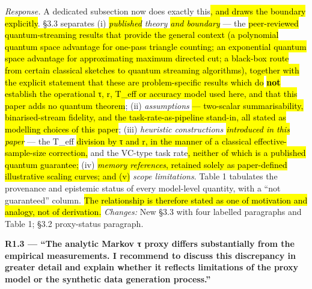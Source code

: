 \documentclass[
  11pt,
]{article}
\providecommand{\DIFadd}[1]{\hl{#1}} %
\providecommand{\DIFdel}[1]{} %
\providecommand{\DIFaddbegin}{} %
\providecommand{\DIFaddend}{} %
\providecommand{\DIFdelbegin}{} %
\providecommand{\DIFdelend}{} %
\providecommand{\DIFaddbegin}{}
\begin{document}
\emph{Response.} A dedicated subsection now does exactly this\DIFaddbegin \DIFadd{, and draws
the boundary explicitly}\DIFaddend . §3.3 separates (i) \emph{\DIFdelbegin \DIFdel{established }\DIFdelend \DIFaddbegin \DIFadd{published }\DIFaddend theory \DIFaddbegin \DIFadd{and
boundary}\DIFaddend } --- the \DIFdelbegin \DIFdel{×R sample overhead,
O(n)-qubit memory, and task-specific O(N\^{}c) classical hardness, all
theorems of the
original framework}\DIFdelend \DIFaddbegin \DIFadd{peer-reviewed quantum-streaming results that provide
the general context (a polynomial quantum space advantage for one-pass
triangle counting; an exponential quantum space advantage for
approximating maximum directed cut; a black-box route from certain
classical sketches to quantum streaming algorithms), together with the
explicit statement that these are problem-specific results which do
}\textbf{\DIFadd{not}} \DIFadd{establish the operational τ, r, T\_eff or accuracy model
used here, and that this paper adds no quantum theorem}\DIFaddend ; (ii)
\emph{assumptions} \DIFdelbegin \DIFdel{this paper
introduces}\DIFdelend \DIFaddbegin \DIFadd{--- two-scalar summarisability, binarised-stream
fidelity, and the task-rate-as-pipeline stand-in, all stated as
modelling choices of this paper}\DIFaddend ; (iii) \emph{heuristic constructions
\DIFaddbegin \DIFadd{introduced in this paper}\DIFaddend } --- the \DIFdelbegin \DIFdel{additional τ
division in }\DIFdelend T\_eff \DIFdelbegin \DIFdel{(deliberately more pessimistic than the
framework's
own accounting, under which no crossover would exist at all) }\DIFdelend \DIFaddbegin \DIFadd{division by τ and r, in the
manner of a classical effective-sample-size correction, }\DIFaddend and the VC-type
task rate\DIFdelbegin \DIFdel{used in place of oracle-construction cost; and }\DIFdelend \DIFaddbegin \DIFadd{, neither of which is a published quantum guarantee; }\DIFaddend (iv)
\DIFaddbegin \emph{\DIFadd{memory references}}\DIFadd{, retained solely as paper-defined illustrative
scaling curves; and (v) }\DIFaddend \emph{scope limitations}. Table 1 tabulates the
provenance and epistemic status of every model-level quantity, with a
``not guaranteed'' column. \DIFaddbegin \DIFadd{The relationship is therefore stated as one
of motivation and analogy, not of derivation. }\DIFaddend \emph{Changes:} New §3.3
with four labelled paragraphs and Table 1; §3.2 proxy-status paragraph.

\textbf{R1.3 --- ``The analytic Markov τ proxy differs substantially
from the empirical measurements. I recommend to discuss this discrepancy
in greater detail and explain whether it reflects limitations of the
proxy model or the synthetic data generation process.''}
\end{document}
